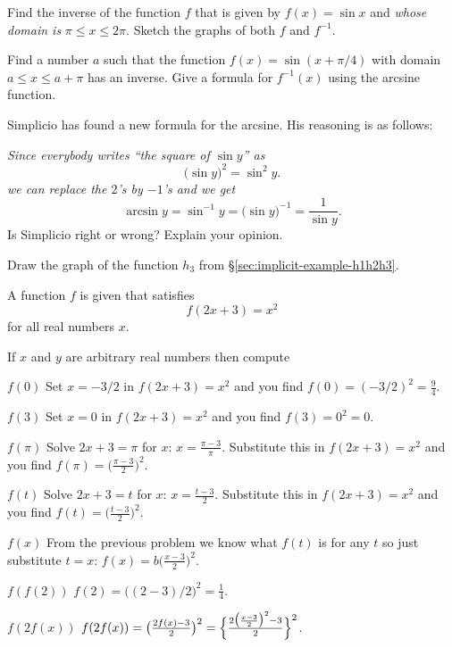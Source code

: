 \begin{multicols}{2}
\problem Find the inverse of the function $f$ that is given by $f(x) = 
\sin x$ and \emph{whose domain is }$\pi\leq x\leq 2\pi$.  Sketch the graphs
of both $f$ and $f^{-1}$.


\problem Find a number $a$ such that the function $f(x) = \sin(x+\pi/4)$ 
with domain $a\leq x\leq a+\pi$ has an inverse.  Give a formula for
$f^{-1}(x)$ using the arcsine function.


\problem Simplicio has found a new formula for the arcsine.  His reasoning 
is as follows:


{\itshape
Since everybody writes ``the square of $\sin y$'' as
\[
  \bigl(\sin y\bigr)^2 = \sin^2 y.
\]
we can replace the $2$'s by $-1$'s and we get
\[
  \arcsin y = \sin^{-1}y
  =
  \bigl(\sin y\bigr)^{-1} = \frac 1{\sin y}.
\]}%
Is Simplicio right or wrong?  Explain your opinion.




\problem Draw the graph of the function $h_3$ from 
\S\ref{sec:implicit-example-h1h2h3}.



\problem A function $f$ is given that satisfies 
\[
  f(2x+3) = x^2
\]
for all real numbers $x$.

If $x$ and $y$ are arbitrary real numbers
then compute



\subprob $f(0)$
\answer 
Set $x=-3/2$ in $f(2x+3) = x^2$ and you find $f(0) = (-3/2)^2 =
\frac{9}{4}$.
\endanswer



\subprob $f(3)$
\answer 
Set $x=0$ in $f(2x+3) = x^2$ and you find $f(3) = 0^2 = 0$.
\endanswer

\subprob $f(\pi)$
\answer 
Solve $2x+3 = \pi$ for $x$:  $x=\frac{\pi-3}{\pi}$.  Substitute this in $f(2x+3) =
x^2$ and you find $f(\pi) = \bigl(\frac{\pi-3}{2}\bigr)^2$.
\endanswer

\subprob $f(t)$
\answer 
Solve $2x+3 = t$ for $x$:  $x=\frac{t-3}{2}$.  Substitute this in $f(2x+3) =
x^2$ and you find $f(t) = \bigl(\frac{t-3}{2}\bigr)^2$.
\endanswer


\subprob $f(x)$
\answer 
From the previous problem we know what $f(t)$ is for any $t$ so just substitute $t=x$:
$f(x)= b\bigl(\frac{x-3}{2}\bigr)^2$.




\endanswer
\subprob $f(f(2))$
\answer 
$f(2) = \bigl((2-3)/2\bigr)^2 = \frac{1}{4}$.
\endanswer


\subprob $f(2f(x))$
\answer 
$f(2f(x)) = \bigl(\frac{2f(x)-3}{2}\bigr)^2 =
\Bigl\{\frac{2\bigl(\frac{x-3}{2}\bigr)^2 - 3}{2}\Bigr\}^2$.




\end{multicols}
